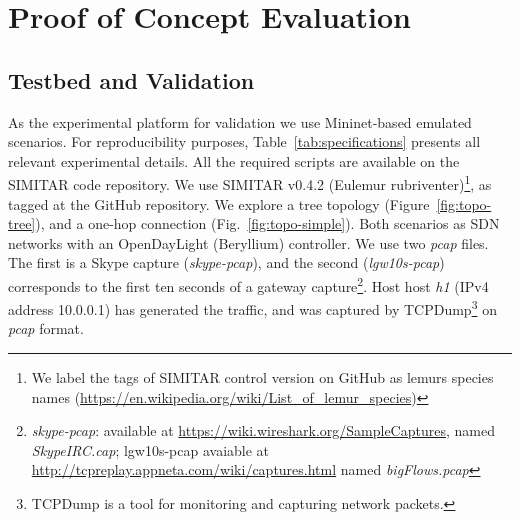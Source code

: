\chapter{Proof of Concept Evaluation}\label{ch:validation}


\section{Testbed and Validation}


As the experimental platform for validation we use Mininet-based emulated scenarios.  For reproducibility purposes, Table~\ref{tab:specifications} presents all relevant experimental details. All the required scripts are available on the SIMITAR code repository\cite{projeto-github}. We use SIMITAR v0.4.2 (Eulemur rubriventer)\footnote{ We label the tags of SIMITAR control version on GitHub as lemurs species names (\href{https://en.wikipedia.org/wiki/List_of_lemur_species}{https://en.wikipedia.org/wiki/List\_of\_lemur\_species})}, as tagged at the GitHub repository. We explore a tree topology (Figure~\ref{fig:topo-tree}), and a one-hop connection (Fig.~\ref{fig:topo-simple}). Both scenarios as  SDN networks with an OpenDayLight (Beryllium) controller. We use two \textit{pcap} files. The first is a Skype capture (\textit{skype-pcap}), and the second (\textit{lgw10s-pcap}) corresponds to the first ten seconds of a gateway capture\footnote{\textit{skype-pcap}: available at \url{https://wiki.wireshark.org/SampleCaptures}, named \textit{SkypeIRC.cap}; lgw10s-pcap avaiable at \url{http://tcpreplay.appneta.com/wiki/captures.html} named \textit{bigFlows.pcap}}. Host host \textit{h1} (IPv4 address 10.0.0.1) has generated the traffic, and was captured by TCPDump\footnote{TCPDump is a tool for monitoring and capturing network packets\cite{web-tcpdump}.} on \textit{pcap} format. 

